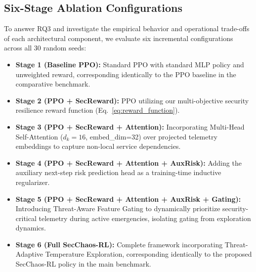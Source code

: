 \documentclass[11pt,a4paper]{article}
\begin{document}
\subsection{Six-Stage Ablation Configurations}
To answer RQ3 and investigate the empirical behavior and operational trade-offs of each architectural component, we evaluate six incremental configurations across all 30 random seeds:
\begin{itemize}
    \item \textbf{Stage 1 (Baseline PPO):} Standard PPO with standard MLP policy and unweighted reward, corresponding identically to the PPO baseline in the comparative benchmark.
    \item \textbf{Stage 2 (PPO + SecReward):} PPO utilizing our multi-objective security resilience reward function (Eq.~\ref{eq:reward_function}).
    \item \textbf{Stage 3 (PPO + SecReward + Attention):} Incorporating Multi-Head Self-Attention ($d_k=16$, embed\_dim=32) over projected telemetry embeddings to capture non-local service dependencies.
    \item \textbf{Stage 4 (PPO + SecReward + Attention + AuxRisk):} Adding the auxiliary next-step risk prediction head as a training-time inductive regularizer.
    \item \textbf{Stage 5 (PPO + SecReward + Attention + AuxRisk + Gating):} Introducing Threat-Aware Feature Gating to dynamically prioritize security-critical telemetry during active emergencies, isolating gating from exploration dynamics.
    \item \textbf{Stage 6 (Full SecChaos-RL):} Complete framework incorporating Threat-Adaptive Temperature Exploration, corresponding identically to the proposed SecChaos-RL policy in the main benchmark.
\end{itemize}
\end{document}

